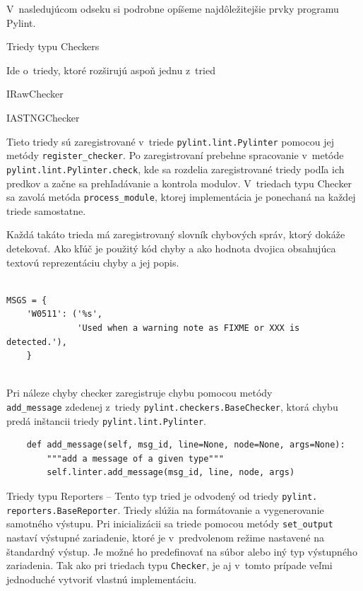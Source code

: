 \documentclass[11pt,oneside,final]{fithesis2}
\begin{document}
		V~nasledujúcom odseku si podrobne opíšeme najdôležitejšie prvky programu Pylint.
		
    \begin{list}{•}{}
		\item Triedy typu Checkers 
		
		Ide o~triedy, ktoré rozširujú aspoň jednu z~tried
		
			    \begin{list}{•}{}
					\item IRawChecker
					\item IASTNGChecker
    			\end{list}		
		
		Tieto triedy sú zaregistrované v~triede \texttt{pylint.lint.Pylinter} pomocou jej metódy \texttt{register\_checker}.	Po zaregistrovaní prebehne spracovanie v~metóde \texttt{pylint.lint.Pylinter.check}, kde sa rozdelia zaregistrované triedy podľa ich predkov a začne sa prehľadávanie a kontrola modulov. V~triedach typu Checker sa zavolá metóda \texttt{process\_module}, ktorej implementácia je ponechaná na každej triede samostatne.
		
		Každá takáto trieda má zaregistrovaný slovník chybových správ, ktorý dokáže detekovať. Ako kľúč je použitý kód chyby a ako hodnota dvojica obsahujúca textovú reprezentáciu chyby a jej popis.
\\\\
\begin{lstlisting}[caption=Slovník chybových hlášok triedy \texttt{EncodingChecker}]
MSGS = {
    'W0511': ('%s',
              'Used when a warning note as FIXME or XXX is detected.'),
    }
		
\end{lstlisting}		



Pri náleze chyby checker zaregistruje chybu pomocou metódy \\\texttt{add\_message} zdedenej z~triedy \texttt{pylint.checkers.BaseChecker}, ktorá chybu predá inštancii triedy \texttt{pylint.lint.Pylinter}.

\begin{lstlisting}
    def add_message(self, msg_id, line=None, node=None, args=None):
        """add a message of a given type"""
        self.linter.add_message(msg_id, line, node, args)
\end{lstlisting}

	
		\item Triedy typu Reporters -- 
		Tento typ tried je odvodený od triedy \texttt{pylint.\\reporters.BaseReporter}. Triedy slúžia na formátovanie a vygenerovanie samotného výstupu. Pri inicializácii sa triede pomocou metódy \texttt{set\_output} nastaví výstupné zariadenie, ktoré je v~predvolenom režime nastavené na štandardný výstup. Je možné ho predefinovať na súbor alebo iný typ výstupného zariadenia. Tak ako pri triedach typu \texttt{Checker}, je aj v~tomto prípade veľmi jednoduché vytvoriť vlastnú implementáciu.
		

\end{list}
\end{document}
